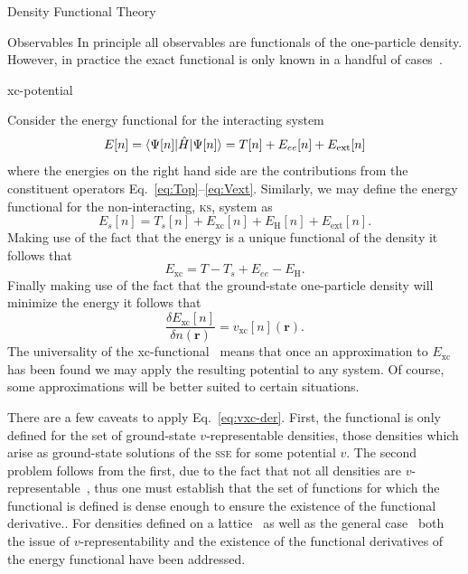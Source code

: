 \documentclass[letterpaper, 11 pt]{report}
\begin{document}
\begin{chapter}{Density Functional Theory \label{chap:dft}}
\begin{section}{Observables \label{sec:obs}}
      In principle all observables are functionals of the one-particle density. However, in practice the
      exact functional is only known in a handful of cases~\cite[p.\ 211-213]{obs_exac}.

   \end{section}

   \begin{section}{xc-potential \label{sec:xcpot}}

      Consider the energy functional for the interacting system
      \begin{equation} \label{eq:efunc}
         E[n] = \braket{\Psi[n] | \hat{H} | \Psi[n] }= T[n] + E_{ee}[n] + E_\mathrm{ext}[n]
      \end{equation}
      where the energies on the right hand side are the contributions from the constituent operators
      Eq.~\eqref{eq:Top}--\eqref{eq:Vext}. Similarly, we may define the energy functional for the
      non-interacting, \textsc{ks}, system as
      \begin{equation} \label{eq:esfunc}
         E_s[n] =  T_s[n] + E_\mathrm{xc}[n] + E_\mathrm{H}[n] + E_\mathrm{ext}[n].
      \end{equation}
      Making use of the fact that the energy is a unique functional of the density it follows that
      \begin{equation} \label{eq:exc}
         E_\mathrm{xc} = T - T_s + E_{ee} - E_\mathrm{H}.
      \end{equation}
      Finally making use of the fact that the ground-state one-particle density will minimize the energy
      it follows that
      \begin{equation} \label{eq:vxc-der}
         \frac{\delta E_\mathrm{xc}[n]}{\delta n(\mathbf{r})} = v_\mathrm{xc}[n](\mathbf{r}).
      \end{equation}
      The universality of the xc-functional~\cite{dft-engel} means that once an approximation to
      $E_\mathrm{xc}$ has been found we may apply the resulting potential to any system. Of course,
      some approximations will be better suited to certain situations.

      There are a few caveats to apply Eq.~\eqref{eq:vxc-der}. First, the functional is only defined
      for the set of ground-state $v$-representable densities, those densities which arise as
      ground-state solutions of the \textsc{sse} for some potential $v$. The second problem follows
      from the first, due to the fact that not all densities are $v$-representable~\cite{not-vrep1,
      not-vrep2, not-vrep3}, thus one must establish that the set of functions for which the functional
      is defined is dense enough to ensure the existence of the functional derivative.. For densities
      defined on a lattice~\cite{vrep-lat} as well as the general case~\cite{nonint1, nonint2,
      vrep-levy1, vrep-levy2, vrep-lieb, vrep-rev} both the issue of $v$-representability and the
      existence of the functional derivatives of the energy functional have been addressed.


\end{section}
\end{chapter}
\end{document}
